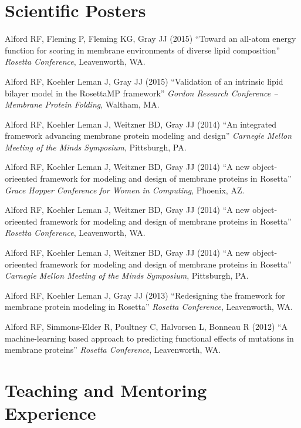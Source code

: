 \documentclass[12pt]{article}
\newcommand{\allcapsspacing}[1]{{\addfontfeature{LetterSpace=7.5}#1}}
\begin{document}
\section*{\allcapsspacing{Scientific Posters}}

\begin{etaremune}
\item Alford RF, Fleming P, Fleming KG, Gray JJ (2015) ``Toward an all-atom energy function for scoring in membrane environments of diverse lipid composition'' \textit{Rosetta Conference}, Leavenworth, WA.
\item Alford RF, Koehler Leman J, Gray JJ (2015) ``Validation of an intrinsic lipid bilayer model in the RosettaMP framework'' \textit{Gordon Research Conference -- Membrane Protein Folding}, Waltham, MA.
\item Alford RF, Koehler Leman J, Weitzner BD, Gray JJ (2014) ``An integrated framework advancing membrane protein modeling and design'' \textit{Carnegie Mellon Meeting of the Minds Symposium}, Pittsburgh, PA.
\item Alford RF, Koehler Leman J, Weitzner BD, Gray JJ (2014) ``A new object-orieented framework for modeling and design of membrane proteins in Rosetta'' \textit{Grace Hopper Conference for Women in Computing}, Phoenix, AZ.
\item Alford RF, Koehler Leman J, Weitzner BD, Gray JJ (2014) ``A new object-orieented framework for modeling and design of membrane proteins in Rosetta'' \textit{Rosetta Conference}, Leavenworth, WA.
\item Alford RF, Koehler Leman J, Weitzner BD, Gray JJ (2014) ``A new object-orieented framework for modeling and design of membrane proteins in Rosetta'' \textit{Carnegie Mellon Meeting of the Minds Symposium}, Pittsburgh, PA.
\item Alford RF, Koehler Leman J, Gray JJ (2013) ``Redesigning the framework for membrane protein modeling in Rosetta'' \textit{Rosetta Conference}, Leavenworth, WA.
\item Alford RF, Simmons-Elder R, Poultney C, Halvorsen L, Bonneau R (2012) ``A machine-learning based approach to predicting functional effects of mutations in membrane proteins'' \textit{Rosetta Conference}, Leavenworth, WA.
\end{etaremune}

\section*{\allcapsspacing{Teaching and Mentoring Experience}}
\end{document}
